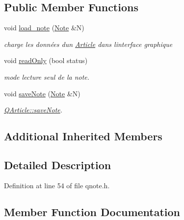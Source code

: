 \subsection*{Public Member Functions}
\begin{DoxyCompactItemize}
\item 
void \hyperlink{class_q_article_aea21c10581abe74709317283739e9552}{load\+\_\+note} (\hyperlink{class_note}{Note} \&N)
\begin{DoxyCompactList}\small\item\em charge les données d\textquotesingle{}un \hyperlink{class_article}{Article} dans l\textquotesingle{}interface graphique \end{DoxyCompactList}\item 
void \hyperlink{class_q_article_af6c14f4ce3df750a0e1a22207309068e}{read\+Only} (bool status)
\begin{DoxyCompactList}\small\item\em mode lecture seul de la note. \end{DoxyCompactList}\item 
void \hyperlink{class_q_article_ae59d03688947d16b86f9ab10384894ec}{save\+Note} (\hyperlink{class_note}{Note} \&N)
\begin{DoxyCompactList}\small\item\em \hyperlink{class_q_article_ae59d03688947d16b86f9ab10384894ec}{Q\+Article\+::save\+Note}. \end{DoxyCompactList}\end{DoxyCompactItemize}
\subsection*{Additional Inherited Members}


\subsection{Detailed Description}


Definition at line 54 of file qnote.\+h.



\subsection{Member Function Documentation}
\mbox{\label{class_q_article_aea21c10581abe74709317283739e9552}} 
